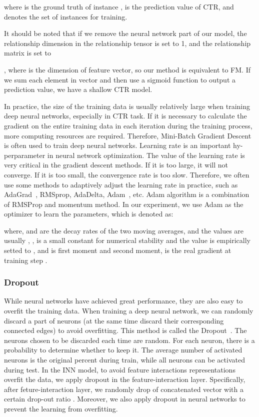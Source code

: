 \documentclass[journal]{IEEEtran}
\begin{document}
where  is the ground truth of instance ,  is the prediction value of CTR, and  denotes the set of instances for training.

It should be noted that if we remove the neural network part of our model, the relationship dimension  in the relationship tensor is set to 1, and the relationship matrix  is set to 

, where  is the dimension of feature vector, so our method is equivalent to FM. If we sum each element in vector  and then use a sigmoid function to output a prediction value, we have a shallow CTR model. 

In practice, the size of the training data is usually relatively large when training deep neural networks, especially in CTR task. If it is necessary to calculate the gradient on the entire training data in each iteration during the training process, more computing resources are required. Therefore, Mini-Batch Gradient Descent is often used to train deep neural networks. Learning rate is an important hy-perparameter in neural network optimization. The value of the learning rate  is very critical in the gradient descent methods. If it is too large, it will not converge. If it is too small, the convergence rate is too slow. Therefore, we often use some methods to adaptively adjust the learning rate in practice, such as AdaGrad~\cite{45}, RMSprop, AdaDelta, Adam~\cite{43}, etc. Adam algorithm is a combination of RMSProp and momentum method. In our experiment, we use Adam as the optimizer to learn the parameters, which is denoted as:



where,  and  are the decay rates of the two moving averages, and the values are usually , ,  is a small constant for numerical stability and the value is empirically setted to ,  and  is first moment and second moment,  is the real gradient at training step .

\subsubsection{Dropout}
While neural networks have achieved great performance, they are also easy to overfit the training data. When training a deep neural network, we can randomly discard a part of neurons (at the same time discard their corresponding connected edges) to avoid overfitting. This method is called the Dropout~\cite{23}. The neurons chosen to be discarded each time are random. For each neuron, there is a probability  to determine whether to keep it. The average number of activated neurons is the original  percent during train, while all neurons can be activated during test. In the INN model, to avoid feature interactions representations overfit the data, we apply dropout in the feature-interaction layer. Specifically, after feture-interaction layer, we randomly drop of concatenated vector with a certain drop-out ratio . Moreover, we also apply dropout in neural networks to prevent the learning from overfitting.
\end{document}
